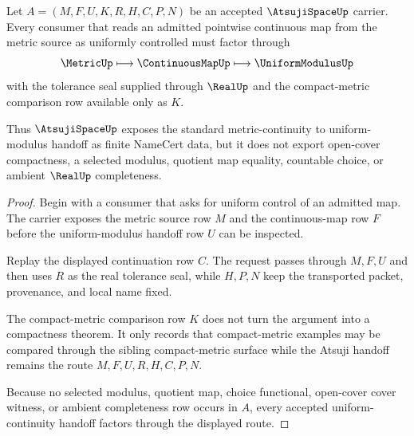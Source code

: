 \begin{theorem}
\label{thm:atsuji-space-uniform-continuity-handoff}
Let $A=(M,F,U,K,R,H,C,P,N)$ be an accepted $\AtsujiSpaceUp$ carrier. Every consumer that reads an admitted pointwise continuous map from the metric source as uniformly controlled must factor through
$$
\MetricUp \longmapsto \ContinuousMapUp \longmapsto \UniformModulusUp
$$
with the tolerance seal supplied through $\RealUp$ and the compact-metric comparison row available only as $K$.

Thus $\AtsujiSpaceUp$ exposes the standard metric-continuity to uniform-modulus handoff as finite NameCert data, but it does not export open-cover compactness, a selected modulus, quotient map equality, countable choice, or ambient $\RealUp$ completeness.
\end{theorem}
\begin{proof}
Begin with a consumer that asks for uniform control of an admitted map. The carrier exposes the metric source row $M$ and the continuous-map row $F$ before the uniform-modulus handoff row $U$ can be inspected.

Replay the displayed continuation row $C$. The request passes through $M,F,U$ and then uses $R$ as the real tolerance seal, while $H,P,N$ keep the transported packet, provenance, and local name fixed.

The compact-metric comparison row $K$ does not turn the argument into a compactness theorem. It only records that compact-metric examples may be compared through the sibling compact-metric surface while the Atsuji handoff remains the route $M,F,U,R,H,C,P,N$.

Because no selected modulus, quotient map, choice functional, open-cover cover witness, or ambient completeness row occurs in $A$, every accepted uniform-continuity handoff factors through the displayed route.
\end{proof}



